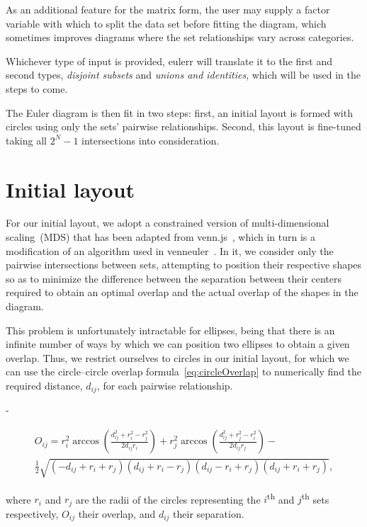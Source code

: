 \documentclass[
  oneside,
  openany,
  numbers=noendperiod,
  parskip=half,
  bibliography=totoc
]{scrbook}\usepackage[]{graphicx}\usepackage{xcolor}
\newlength{\overhang}
\newenvironment{fullwidth}{%
  \blockmargin
  \begin{addmargin*}[0em]{-\overhang}%
}{%
  \end{addmargin*}%
  \unblockmargin
}
\newcommand{\pkg}[1]{{\fontseries{b}\selectfont #1}}
\let\ts\textsuperscript
\begin{document}
As an additional feature for the matrix form, the user may supply a factor
variable with which to split the data set before fitting the diagram,
which sometimes improves diagrams where the set relationships vary
across categories.

Whichever type of input is provided, \pkg{eulerr} will translate it to the first
and second types, \emph{disjoint subsets} and
\emph{unions and identities}, which will be used in the steps to come.

The Euler diagram is then fit in two
steps: first, an initial layout is formed with circles using only the
sets' pairwise relationships. Second, this layout is fine-tuned taking
all $2^N-1$ intersections into consideration.

\section{Initial layout}
\label{sec:initConfig}

For our initial layout, we adopt a constrained version of
multi-dimensional scaling~(MDS) that has been adapted from
\pkg{venn.js}~\citep{Frederickson_2016}, which in turn is a modification of
an algorithm used in \pkg{venneuler}~\citep{Wilkinson_2012}.
In it, we consider only the pairwise intersections between sets, attempting to
position their respective shapes so as to minimize the difference between the
separation between their centers
required to obtain an optimal overlap
and the actual overlap of the shapes in the diagram.

This problem is unfortunately intractable for ellipses, being that there is an
infinite number of ways by which we can position two ellipses to obtain a given
overlap. Thus, we restrict ourselves to circles in our initial layout, for which we can use the
circle--circle overlap formula~\eqref{eq:circleOverlap} to numerically find the
required distance, $d_{ij}$, for each pairwise relationship.
\begin{fullwidth}
\begin{multline}
O_{ij} = r_i^2\arccos\left(\frac{d_{ij}^2 + r_i^2 - r_j^2}{2d_{ij}r_i}\right) +
r_j^2\arccos\left(\frac{d_{ij}^2 + r_j^2 - r_i^2}{2d_{ij}r_j}\right) - \\
\frac{1}{2}\sqrt{(-d_{ij} + r_i + r_j)(d_{ij} + r_i - r_j)(d_{ij} - r_i + r_j)(d_{ij} + r_i + r_j)},
\label{eq:circleOverlap}
\end{multline}
\end{fullwidth}
where $r_i$ and $r_j$ are the radii of the circles representing the $i$\ts{th} and
$j$\ts{th} sets respectively, $O_{ij}$ their overlap, and $d_{ij}$ their separation.
\end{document}
